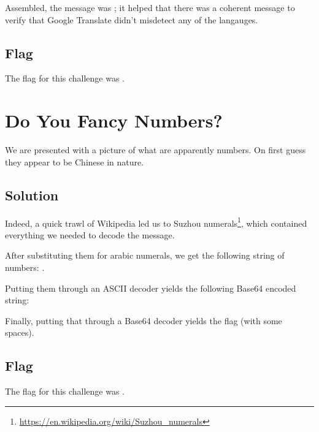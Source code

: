		Assembled, the message was ; it helped that there was a coherent message to verify that
		Google Translate didn't misdetect any of the langauges.


	\subsection{Flag}
		The flag for this challenge was .



\pagebreak
\section{Do You Fancy Numbers?}

	We are presented with a picture of what are apparently numbers. On first guess they appear to be Chinese in nature.

	\subsection{Solution}

		Indeed, a quick trawl of Wikipedia led us to Suzhou numerals\footnote{\url{https://en.wikipedia.org/wiki/Suzhou_numerals}}, which
		contained everything we needed to decode the message.

		After substituting them for arabic numerals, we get the following string of numbers:
		  \ttt{68}           
		             
		        .

		Putting them through an ASCII decoder yields the following Base64 encoded string:

		Finally, putting that through a Base64 decoder yields the flag (with some spaces).


	\subsection{Flag}
		The flag for this challenge was .











